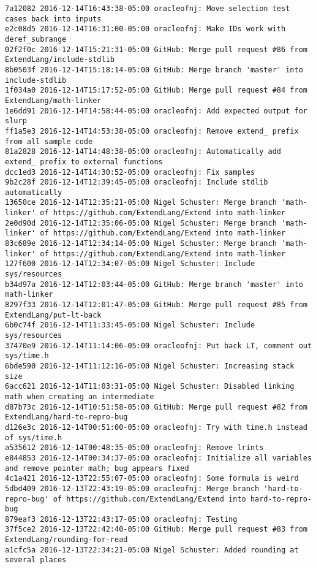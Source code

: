 \begin{lstlisting}
7a12082 2016-12-14T16:43:38-05:00 oracleofnj: Move selection test cases back into inputs
e2c08d5 2016-12-14T16:31:00-05:00 oracleofnj: Make IDs work with deref_subrange
02f2f0c 2016-12-14T15:21:31-05:00 GitHub: Merge pull request #86 from ExtendLang/include-stdlib
8b0503f 2016-12-14T15:18:14-05:00 GitHub: Merge branch 'master' into include-stdlib
1f034a0 2016-12-14T15:17:52-05:00 GitHub: Merge pull request #84 from ExtendLang/math-linker
1e6dd91 2016-12-14T14:58:44-05:00 oracleofnj: Add expected output for slurp
ff1a5e3 2016-12-14T14:53:38-05:00 oracleofnj: Remove extend_ prefix from all sample code
81a2828 2016-12-14T14:48:38-05:00 oracleofnj: Automatically add extend_ prefix to external functions
dcc1ed3 2016-12-14T14:30:52-05:00 oracleofnj: Fix samples
9b2c28f 2016-12-14T12:39:45-05:00 oracleofnj: Include stdlib automatically
13650ce 2016-12-14T12:35:21-05:00 Nigel Schuster: Merge branch 'math-linker' of https://github.com/ExtendLang/Extend into math-linker
2e0d90d 2016-12-14T12:35:06-05:00 Nigel Schuster: Merge branch 'math-linker' of https://github.com/ExtendLang/Extend into math-linker
83c689e 2016-12-14T12:34:14-05:00 Nigel Schuster: Merge branch 'math-linker' of https://github.com/ExtendLang/Extend into math-linker
127f600 2016-12-14T12:34:07-05:00 Nigel Schuster: Include sys/resources
b34d97a 2016-12-14T12:03:44-05:00 GitHub: Merge branch 'master' into math-linker
8297f33 2016-12-14T12:01:47-05:00 GitHub: Merge pull request #85 from ExtendLang/put-lt-back
6b0c74f 2016-12-14T11:33:45-05:00 Nigel Schuster: Include sys/resources
37470e9 2016-12-14T11:14:06-05:00 oracleofnj: Put back LT, comment out sys/time.h
6bde590 2016-12-14T11:12:16-05:00 Nigel Schuster: Increasing stack size
6acc621 2016-12-14T11:03:31-05:00 Nigel Schuster: Disabled linking math when creating an intermediate
d87b73c 2016-12-14T10:51:58-05:00 GitHub: Merge pull request #82 from ExtendLang/hard-to-repro-bug
d126e3c 2016-12-14T00:51:00-05:00 oracleofnj: Try with time.h instead of sys/time.h
a535612 2016-12-14T00:48:35-05:00 oracleofnj: Remove lrints
e844853 2016-12-14T00:34:37-05:00 oracleofnj: Initialize all variables and remove pointer math; bug appears fixed
4c1a421 2016-12-13T22:55:07-05:00 oracleofnj: Some formula is weird
5dbd409 2016-12-13T22:43:19-05:00 oracleofnj: Merge branch 'hard-to-repro-bug' of https://github.com/ExtendLang/Extend into hard-to-repro-bug
879eaf3 2016-12-13T22:43:17-05:00 oracleofnj: Testing
37f5ce2 2016-12-13T22:42:40-05:00 GitHub: Merge pull request #83 from ExtendLang/rounding-for-read
a1cfc5a 2016-12-13T22:34:21-05:00 Nigel Schuster: Added rounding at several places

\end{lstlisting}
